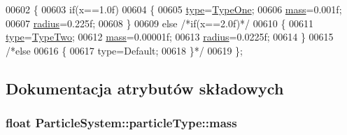 \begin{DoxyCode}
00602                 \{
00603                         \textcolor{keywordflow}{if}(x==1.0f)
00604                         \{
00605                                 \hyperlink{class_particle_system_1_1particle_type_aa28b152ee001a7797b9a308291a8c92a}{type}=\hyperlink{class_particle_system_1_1particle_type_a41677c7a6376be429aae198a3d6d0dcfabf31550fb1eca476d61467c6e2f37e4a}{TypeOne};
00606                                 \hyperlink{class_particle_system_1_1particle_type_a7b31955f076be65f9bd704a23032597c}{mass}=0.001f;
00607                                 \hyperlink{class_particle_system_1_1particle_type_a262c51b90d7c71f897584e1584c22a41}{radius}=0.225f;
00608                         \}
00609                         \textcolor{keywordflow}{else} \textcolor{comment}{/*if(x==2.0f)*/}
00610                         \{
00611                                 \hyperlink{class_particle_system_1_1particle_type_aa28b152ee001a7797b9a308291a8c92a}{type}=\hyperlink{class_particle_system_1_1particle_type_a41677c7a6376be429aae198a3d6d0dcfa62eb1dd5282cb0f225ab2a1de3df820d}{TypeTwo};
00612                                 \hyperlink{class_particle_system_1_1particle_type_a7b31955f076be65f9bd704a23032597c}{mass}=0.00001f;
00613                                 \hyperlink{class_particle_system_1_1particle_type_a262c51b90d7c71f897584e1584c22a41}{radius}=0.0225f;
00614                         \}
00615                         \textcolor{comment}{/*else}
00616 \textcolor{comment}{                        \{}
00617 \textcolor{comment}{                                type=Default;}
00618 \textcolor{comment}{                        \}*/}
00619                 \};
\end{DoxyCode}


\subsection{Dokumentacja atrybutów składowych}
\hypertarget{class_particle_system_1_1particle_type_a7b31955f076be65f9bd704a23032597c}{
\subsubsection[{mass}]{\setlength{\rightskip}{0pt plus 5cm}float Particle\-System\-::particle\-Type\-::mass}}\label{class_particle_system_1_1particle_type_a7b31955f076be65f9bd704a23032597c}


